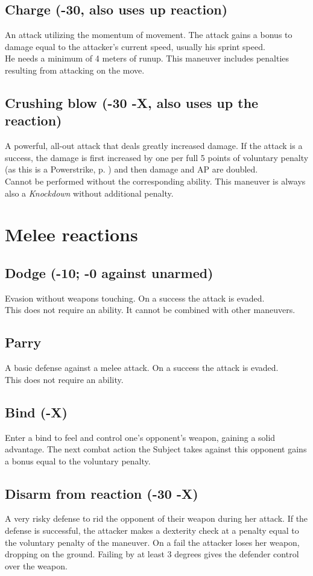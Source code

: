 \subsection*{Charge (-30, also uses up reaction)}
An attack utilizing the momentum of movement.
The attack gains a bonus to damage equal to the attacker’s current speed,
	usually his sprint speed.
\\%
He needs a minimum of 4 meters of runup.
This maneuver includes penalties resulting from attacking on the move.
\subsection*{Crushing blow (-30 -X, also uses up the reaction)}
A powerful, all-out attack that deals greatly increased damage.
If the attack is a success,
	the damage is first increased by one per full 5 points of voluntary penalty
	(as this is a Powerstrike, p. \pageref{mvr:powerstrike}) and
	then damage and AP are doubled.\\
Cannot be performed without the corresponding ability. This maneuver is always also a \emph{Knockdown} without additional penalty.

\section{Melee reactions}
\subsection*{Dodge (-10; -0 against unarmed)}
Evasion without weapons touching. On a success the attack is evaded.\\
This does not require an ability. It cannot be combined with other maneuvers.
\subsection*{Parry}
A basic defense against a melee attack. On a success the attack is evaded.\\
This does not require an ability.
\subsection*{Bind (-X)}
Enter a bind to feel and control one’s opponent’s weapon,
	gaining a solid advantage.
The next combat action the Subject takes against this opponent gains a bonus equal to the voluntary penalty.
\subsection*{Disarm from reaction (-30 -X)}
A very risky defense to rid the opponent of their weapon during her attack. If the defense is successful, the attacker makes a dexterity check at a penalty equal to the voluntary penalty of the maneuver. On a fail the attacker loses her weapon, dropping on the ground. Failing by at least 3 degrees gives the defender control over the weapon.

